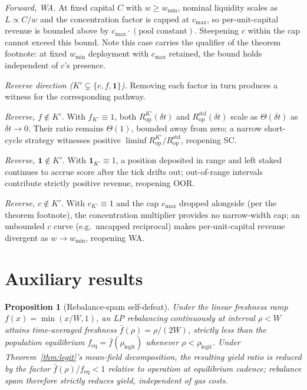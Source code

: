 \documentclass[11pt,a4paper]{article}
\theoremstyle{definition}
\theoremstyle{plain}
\newtheorem{proposition}{Proposition}
\theoremstyle{remark}
\begin{document}
\noindent\emph{Forward, WA.} At fixed capital $C$ with $w \geq w_{\min}$, nominal liquidity scales as $L \propto C/w$ and the concentration factor is capped at $c_{\max}$, so per-unit-capital revenue is bounded above by $c_{\max} \cdot (\text{pool constant})$. Steepening $c$ within the cap cannot exceed this bound. Note this case carries the qualifier of the theorem footnote: at fixed $w_{\min}$ deployment with $c_{\max}$ retained, the bound holds independent of $c$'s presence.

\noindent\emph{Reverse direction ($K' \subsetneq \{c, f, \mathbf{1}\}$).} Removing each factor in turn produces a witness for the corresponding pathway.

\noindent\emph{Reverse, $f \notin K'$.} With $f_{K'} \equiv 1$, both $R^{K'}_{\text{op}}(\delta t)$ and $R^{\text{std}}_{\text{op}}(\delta t)$ scale as $\Theta(\delta t)$ as $\delta t \to 0$. Their ratio remains $\Theta(1)$, bounded away from zero; a narrow short-cycle strategy witnesses positive $\liminf R^{K'}_{\text{op}} / R^{\text{std}}_{\text{op}}$, reopening SC.

\noindent\emph{Reverse, $\mathbf{1} \notin K'$.} With $\mathbf{1}_{K'} \equiv 1$, a position deposited in range and left staked continues to accrue score after the tick drifts out; out-of-range intervals contribute strictly positive revenue, reopening OOR.

\noindent\emph{Reverse, $c \notin K'$.} With $c_{K'} \equiv 1$ and the cap $c_{\max}$ dropped alongside (per the theorem footnote), the concentration multiplier provides no narrow-width cap; an unbounded $c$ curve (e.g.\ uncapped reciprocal) makes per-unit-capital revenue divergent as $w \to w_{\min}$, reopening WA.

\section{Auxiliary results}\label{app:auxiliary}

\begin{proposition}[Rebalance-spam self-defeat]\label{prop:spam}
Under the linear freshness ramp $f(x) = \min(x/W, 1)$, an LP rebalancing continuously at interval $\rho < W$ attains time-averaged freshness $\bar f(\rho) = \rho/(2W)$, strictly less than the population equilibrium $f_{\text{eq}} = \bar f(\rho_{\text{legit}})$ whenever $\rho < \rho_{\text{legit}}$. Under Theorem~\ref{thm:legit}'s mean-field decomposition, the resulting yield ratio is reduced by the factor $\bar f(\rho)/f_{\text{eq}} < 1$ relative to operation at equilibrium cadence; rebalance spam therefore strictly reduces yield, independent of gas costs.
\end{proposition}
\end{document}
